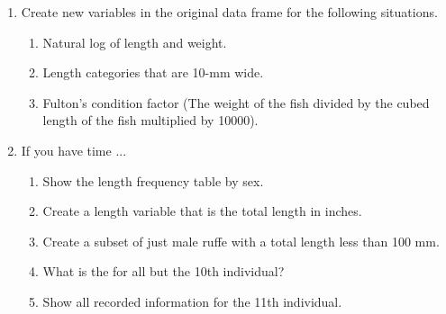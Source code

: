 \documentclass{article}\usepackage[]{graphicx}\usepackage[]{color}
\begin{document}
\begin{enumerate}
\begin{enumerate}
    \end{enumerate}
  \item Create new variables in the original data frame for the following situations.
    \begin{enumerate}
      \item Natural log of length and weight.


      \item Length categories that are 10-mm wide.


      \item Fulton's condition factor (The weight of the fish divided by the cubed length of the fish multiplied by 10000).


    \end{enumerate}
  \vspace{12pt}
  \item If you have time ...
    \begin{enumerate}
      \item Show the length frequency table by sex.


      \item Create a length variable that is the total length in inches.


      \item Create a subset of just male ruffe with a total length less than 100 mm.


      \item What is the  for all but the 10th individual?


      \item Show all recorded information for the 11th individual.


    \end{enumerate}
\end{enumerate}
\end{document}
